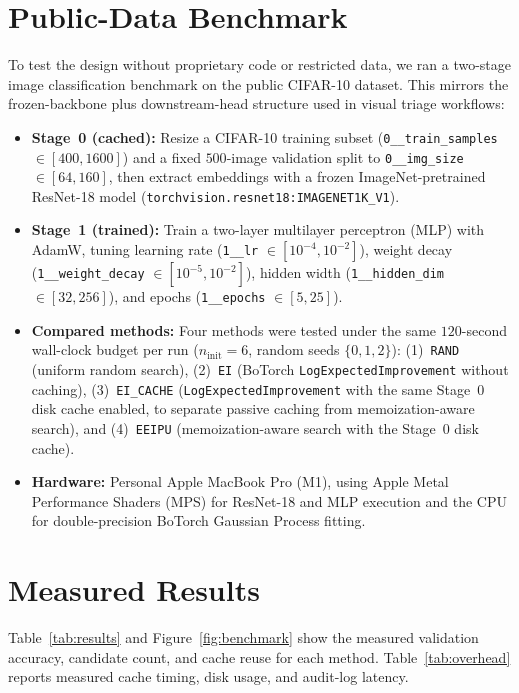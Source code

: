 \documentclass[11pt,letterpaper]{article}
\begin{document}
\section{Public-Data Benchmark}
To test the design without proprietary code or restricted data, we ran a two-stage image classification benchmark on the public CIFAR-10 dataset. This mirrors the frozen-backbone plus downstream-head structure used in visual triage workflows:
\begin{itemize}
  \item \textbf{Stage~0 (cached):} Resize a CIFAR-10 training subset (\texttt{0\_\_train\_samples} $\in [400, 1600]$) and a fixed $500$-image validation split to \texttt{0\_\_img\_size} $\in [64, 160]$, then extract embeddings with a frozen ImageNet-pretrained ResNet-18 model (\texttt{torchvision.resnet18:IMAGENET1K\_V1}).
  \item \textbf{Stage~1 (trained):} Train a two-layer multilayer perceptron (MLP) with AdamW, tuning learning rate (\texttt{1\_\_lr} $\in [10^{-4}, 10^{-2}]$), weight decay (\texttt{1\_\_weight\_decay} $\in [10^{-5}, 10^{-2}]$), hidden width (\texttt{1\_\_hidden\_dim} $\in [32, 256]$), and epochs (\texttt{1\_\_epochs} $\in [5, 25]$).
  \item \textbf{Compared methods:} Four methods were tested under the same $120$-second wall-clock budget per run ($n_{\text{init}} = 6$, random seeds $\{0, 1, 2\}$): (1)~\texttt{RAND} (uniform random search), (2)~\texttt{EI} (BoTorch \texttt{LogExpectedImprovement} without caching), (3)~\texttt{EI\_CACHE} (\texttt{LogExpectedImprovement} with the same Stage~0 disk cache enabled, to separate passive caching from memoization-aware search), and (4)~\texttt{EEIPU} (memoization-aware search with the Stage~0 disk cache).
  \item \textbf{Hardware:} Personal Apple MacBook Pro (M1), using Apple Metal Performance Shaders (MPS) for ResNet-18 and MLP execution and the CPU for double-precision BoTorch Gaussian Process fitting.
\end{itemize}

\section{Measured Results}
Table~\ref{tab:results} and Figure~\ref{fig:benchmark} show the measured validation accuracy, candidate count, and cache reuse for each method. Table~\ref{tab:overhead} reports measured cache timing, disk usage, and audit-log latency.
\end{document}
